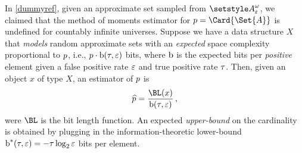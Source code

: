 \documentclass[10pt,final,hidelinks]{article}
\numberwithin{equation}{section}
\begin{document}
In \cref{dummyref}, given an approximate set sampled from $\ASet{A}[\fprate][\fnrate]$, we claimed that the method of moments estimator for $\p = \Card{\Set{A}}$ is undefined for countably infinite universes.
Suppose we have a data structure $X$ that \emph{models} random approximate sets with an \emph{expected} space complexity proportional to $p$, i.e., $\p \cdot \Fun{b}(\tprate,\fprate)$ bits, where $\Fun{b}$ is the expected bits per \emph{positive} element given a false positive rate $\varepsilon$ and true positive rate $\tau$.
Then, given an object $x$ of type $X$, an estimator of $p$ is
\begin{equation}
	\widehat{\p} = \frac{\BL(x)}{\Fun{b}(\tprate,\fprate)}\,,
\end{equation}
were $\BL$ is the bit length function.
An expected \emph{upper-bound} on the cardinality is obtained by plugging in the information-theoretic lower-bound $\Fun{b}^{*}(\tprate,\fprate) = -\tprate \log_2 \fprate$ bits per element.

\providecommand{\mainx}{..}
\newcommand{\tsr}{\tprate_{\ASet{X} \subseteq \ASet{Y}}}
\end{document}
